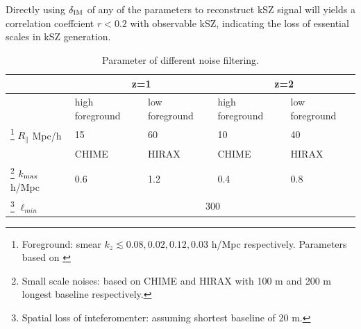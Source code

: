 Directly using $\delta_\mathrm{IM}$ of any of the parameters 
to reconstruct kSZ signal will 
yields a correlation coeffcient $r<0.2$ 
with observable kSZ, 
indicating the loss of essential scales in kSZ generation.


\begin{table}
\begin{tabular}{|m{2cm}|m{1.5cm}|m{1.5cm}|m{1.5cm}|m{1.5cm}|}
    \hline
     & \multicolumn{2}{|c|}{z=1} &\multicolumn{2}{|c|}{z=2}\\
     \hline
     & high foreground &low foreground&high foreground& low foreground\\
     \cline{2-5}
     \footnote{Foreground: smear $k_z\lesssim 0.08,0.02,0.12,0.03$ h/Mpc respectively. Parameters based on \cite{2013ApJ...763L..20M,Switzer13,15Shaw}}
     $R_\parallel$ Mpc/h
      & 15 & 60 & 10 & 40 \\
     \hline
     & CHIME & HIRAX & CHIME &HIRAX\\
     \cline{2-5}
     \footnote{Small scale noises: based on CHIME\cite{2014CHIME} and HIRAX\cite{HIRAX} 
     with 100 m and 200 m longest baseline respectively.}
     $k_\mathrm{max}$ h/Mpc 
     & 0.6 & 1.2 & 0.4 & 0.8 \\
     \hline
     \footnote{Spatial loss of inteferomenter: assuming shortest baseline of 20 m.}
     $\ell_{min}$
     & \multicolumn{4}{|c|}{300} \\
     \hline
\end{tabular}
     \caption{Parameter of different noise filtering.}
     \label{tab:para}
\end{table}
